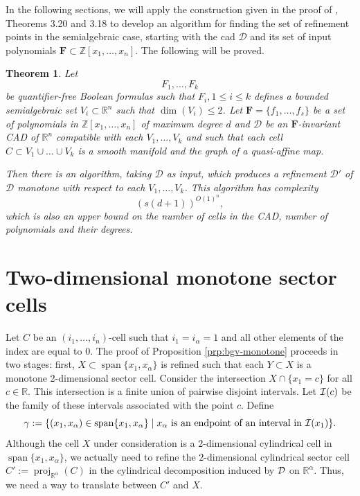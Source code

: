 \documentclass[
]{book}
\newtheorem{theorem}{Theorem}[chapter]
\theoremstyle{definition}
\theoremstyle{definition}
\theoremstyle{definition}
\theoremstyle{definition}
\theoremstyle{remark}
\begin{document}
In the following sections, we will apply the construction given in the proof of \citet{bgv15}, Theorems 3.20 and 3.18 to develop an algorithm for finding the set of refinement points in the semialgebraic case, starting with the cad \(\mathcal{D}\) and its set of input polynomials \(\mathbf{F} \subset \mathbb{Z}[x_1,\ldots,x_n]\). The following will be proved.

\begin{theorem}
\protect\hypertarget{thm:bgv-monotone-algorithm}{}\label{thm:bgv-monotone-algorithm}Let
\[
F_1,\ldots,F_k
\]
be quantifier-free Boolean formulas such that \(F_i, 1\le i \le k\) defines a bounded semialgebraic set \(V_i \subset \mathbb{R}^n\) such that \(\dim(V_i) \le 2\).
Let \(\mathbf{F} = \{f_1,\ldots,f_s\}\) be a set of polynomials in \(\mathbb{Z}[x_1,\ldots,x_n]\) of maximum degree \(d\) and \(\mathcal{D}\) be an \(\mathbf{F}\)-invariant CAD of \(\mathbb{R}^n\) compatible with each \(V_1,\ldots,V_k\) and such that each cell \(C \subset V_1\cup\ldots\cup V_k\) is a smooth manifold and the graph of a quasi-affine map.

Then there is an algorithm, taking \(\mathcal{D}\) as input, which produces a refinement \(\mathcal{D'}\) of \(\mathcal{D}\) monotone with respect to each \(V_1, \ldots, V_k\).
This algorithm has complexity
\[
\left(s\left(d+1\right)\right)^{{O(1)^n}},
\]
which is also an upper bound on the number of cells in the CAD, number of polynomials and their degrees.
\end{theorem}

\hypertarget{sec:monotone-sectors}{%
\section{Two-dimensional monotone sector cells}\label{sec:monotone-sectors}}

Let \(C\) be an \((i_1,\ldots,i_n)\)-cell such that \(i_1 = i_\alpha = 1\) and all other elements of the index are equal to \(0\).
The proof of Proposition \ref{prp:bgv-monotone} proceeds in two stages: first, \(X \subset {\operatorname{span} \{x_1,x_\alpha\}}\) is refined such that each \(Y \subset X\) is a monotone 2-dimensional sector cell.
Consider the intersection \(X \cap \{x_1 = c\}\) for all \(c\in \mathbb{R}\). This intersection is a finite union of pairwise disjoint intervals. Let \({\cal I} (c)\) be the family of these intervals associated with the point \(c\). Define
\[
\gamma := \{ (x_1,x_\alpha) \in {\operatorname{span} \{x_1,x_\alpha\}} \mid x_\alpha \text{ is an endpoint of an interval in } {\cal I}(x_1) \}.
\]
Although the cell \(X\) under consideration is a \(2\)-dimensional cylindrical cell in \({\operatorname{span} \{x_1,x_\alpha\}}\), we actually need to refine the \(2\)-dimensional cylindrical sector cell \(C' := {\operatorname{proj}_{\mathbb{R}^{\alpha}}}(C)\) in the cylindrical decomposition induced by \(\cal D\) on \(\mathbb{R}^{\alpha}\). Thus, we need a way to translate between \(C'\) and \(X\).
\end{document}
